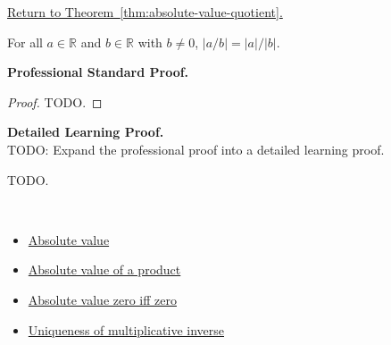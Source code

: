 \newpage
{}
\label{prf:absolute-value-quotient}

\begin{remark*}[Return]
\hyperref[thm:absolute-value-quotient]{Return to Theorem~\ref*{thm:absolute-value-quotient}.}
\end{remark*}

\begin{theorem*}
For all $a \in \mathbb{R}$ and $b \in \mathbb{R}$ with $b \ne 0$,
$\lvert a/b \rvert = \lvert a \rvert / \lvert b \rvert$.
\end{theorem*}

\textbf{Professional Standard Proof.}~\\
\begin{proof}
TODO.
\end{proof}

\textbf{Detailed Learning Proof.}~\\
TODO: Expand the professional proof into a detailed learning proof.


\begin{remark*}
TODO.
\end{remark*}

\begin{remark*}[Dependencies]~\\
\begin{itemize}
  \item \hyperref[def:absolute-value]{Absolute value}
  \item \hyperref[thm:absolute-value-product]{Absolute value of a product}
  \item \hyperref[thm:absolute-value-zero-iff-zero]{Absolute value zero iff zero}
  \item \hyperref[thm:uniqueness-of-multiplicative-inverse]{Uniqueness of multiplicative inverse}
\end{itemize}
\end{remark*}
